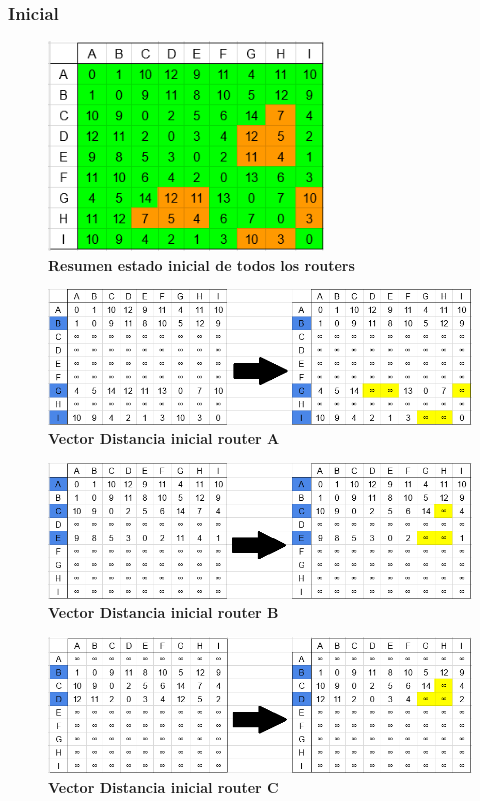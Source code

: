 \documentclass[12pt]{article}
\begin{document}
\subsubsection{Inicial}
\begin{figure}[H] 
\centering 
\includegraphics[width=0.65\textwidth]{imagenes/3inicial.png} \caption{\small \textbf{Resumen estado inicial de todos los routers}}
\label{fig:diagrama_54} 
\end{figure}
\begin{figure}[H] 
\includegraphics[width=1\textwidth]{imagenes/3inicialA.png} \caption{\small \textbf{Vector Distancia inicial router A}}
\label{fig:diagrama_55} 
\end{figure}
\begin{figure}[H] 
\includegraphics[width=1\textwidth]{imagenes/3inicialB.png} \caption{\small \textbf{Vector Distancia inicial router B}}
\label{fig:diagrama_56} 
\end{figure}
\begin{figure}[H] 
\includegraphics[width=1\textwidth]{imagenes/3inicialC.png} \caption{\small \textbf{Vector Distancia inicial router C}}
\label{fig:diagrama_57} 
\end{figure}
\end{document}
